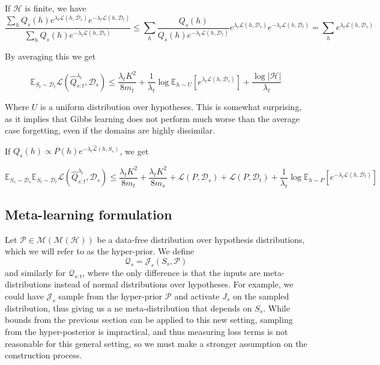 \documentclass[letterpaper]{article}
\theoremstyle{definition}
\begin{document}
If $\mathcal{H}$ is finite, we have 
$$\frac{\sum_h Q_s(h)e^{\lambda_t\mathcal{L}(h,\mathcal{D}_s)}e^{-\lambda_t\mathcal{L}(h,\mathcal{D}_t)}}{\sum_h Q_s(h)e^{-\lambda_t\mathcal{L}(h,\mathcal{D}_t)}}\leq 
\sum_h \frac{Q_s(h)}{Q_s(h)e^{-\lambda_t\mathcal{L}(h,\mathcal{D}_t)}}e^{\lambda_t\mathcal{L}(h,\mathcal{D}_s)}e^{-\lambda_t\mathcal{L}(h,\mathcal{D}_t)}=\sum_h{e^{\lambda_t\mathcal{L}(h,\mathcal{D}_s)}} $$

By averaging this we get

\begin{equation} 
\mathbb{E}_{S_t\sim \mathcal{D}_t}\mathcal{L}( \hat{Q}^{\lambda_t}_{s:t},\mathcal{D}_s)\leq \frac{\lambda_t K^2}{8m_t}+\frac{1}{\lambda_t}\log\mathbb{E}_{h\sim U}\left [e^{\lambda_t\mathcal{L}(h,\mathcal{D}_s)}\right ] + \frac{\log |\mathcal{H}|}{\lambda_t}
\end{equation}

Where $U$ is a uniform distribution over hypotheses. This is somewhat surprising, as it implies that Gibbs learning does not perform much worse than the average case forgetting, even if the domains are highly dissimilar.

If $Q_s(h)\propto P(h)e^{-\lambda_t\hat{\mathcal{L}}(h,S_s)}$, we get 

\begin{equation} 
\mathbb{E}_{S_s\sim \mathcal{D}_s}\mathbb{E}_{S_t\sim \mathcal{D}_t}\mathcal{L}( \hat{Q}^{\lambda_t}_{s:t},\mathcal{D}_s)\leq \frac{\lambda_t K^2}{8m_t}+\frac{\lambda_t K^2}{8m_s}+\mathcal{L}(P,\mathcal{D}_s)+\mathcal{L}(P,\mathcal{D}_t) +\frac{1}{\lambda_t}\log\mathbb{E}_{h\sim P}\left [e^{-\lambda_t\mathcal{L}(h,\mathcal{D}_t)} \right ]
\end{equation}

\subsection{Meta-learning formulation}

Let $\mathcal{P}\in\mathcal{M}(\mathcal{M}(\mathcal{H}))$ be a data-free distribution over hypothesis distributions, which we will refer to as the hyper-prior. We define 
$$\mathcal{Q}_s=\mathcal{J}_s(S_s,\mathcal{P})$$ and similarly for $\mathcal{Q}_{s:t}$, where the only difference is that the inputs are meta-distributions instead of normal distributions over hypotheses. For example, we could have $\mathcal{J}_s$ sample from the hyper-prior $\mathcal{P}$ and activate $J_s$ on the sampled distribution, thus giving us a ne meta-distribution that depends on $S_s$. While bounds from the previous section can be applied to this new setting, sampling from the hyper-posterior is impractical, and thus measuring loss terms is not reasonable for this general setting, so we must make a stronger assumption on the construction process.
\end{document}
